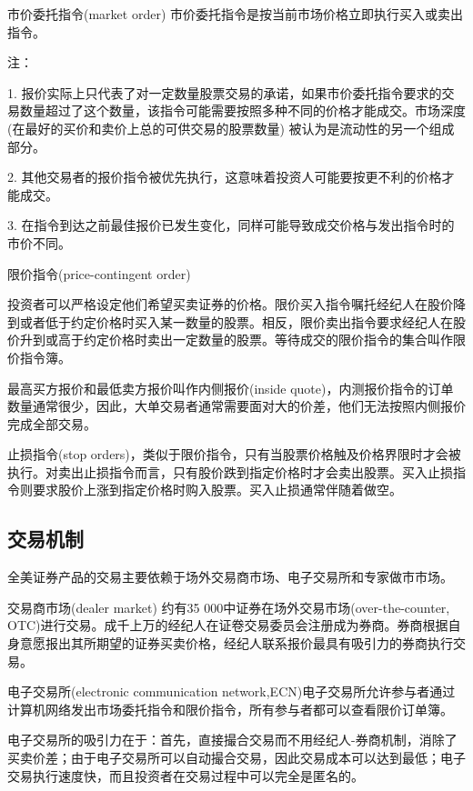\documentclass{article}
\begin{document}
市价委托指令(market order) 市价委托指令是按当前市场价格立即执行买入或卖出指令。

注：

1. 报价实际上只代表了对一定数量股票交易的承诺，如果市价委托指令要求的交易数量超过了这个数量，该指令可能需要按照多种不同的价格才能成交。市场深度(在最好的买价和卖价上总的可供交易的股票数量) 被认为是流动性的另一个组成部分。

2. 其他交易者的报价指令被优先执行，这意味着投资人可能要按更不利的价格才能成交。

3. 在指令到达之前最佳报价已发生变化，同样可能导致成交价格与发出指令时的市价不同。

\hspace*{\fill}

限价指令(price-contingent order)

投资者可以严格设定他们希望买卖证券的价格。限价买入指令嘱托经纪人在股价降到或者低于约定价格时买入某一数量的股票。相反，限价卖出指令要求经纪人在股价升到或高于约定价格时卖出一定数量的股票。等待成交的限价指令的集合叫作限价指令簿。

最高买方报价和最低卖方报价叫作内侧报价(inside quote)，内测报价指令的订单数量通常很少，因此，大单交易者通常需要面对大的价差，他们无法按照内侧报价完成全部交易。

止损指令(stop orders)，类似于限价指令，只有当股票价格触及价格界限时才会被执行。对卖出止损指令而言，只有股价跌到指定价格时才会卖出股票。买入止损指令则要求股价上涨到指定价格时购入股票。买入止损通常伴随着做空。

\subsection{交易机制}
全美证券产品的交易主要依赖于场外交易商市场、电子交易所和专家做市市场。

交易商市场(dealer market) 约有35 000中证券在场外交易市场(over-the-counter, OTC)进行交易。成千上万的经纪人在证卷交易委员会注册成为券商。券商根据自身意愿报出其所期望的证券买卖价格，经纪人联系报价最具有吸引力的券商执行交易。

\hspace*{\fill}

电子交易所(electronic communication network,ECN)电子交易所允许参与者通过计算机网络发出市场委托指令和限价指令，所有参与者都可以查看限价订单簿。

电子交易所的吸引力在于：首先，直接撮合交易而不用经纪人-券商机制，消除了买卖价差；由于电子交易所可以自动撮合交易，因此交易成本可以达到最低；电子交易执行速度快，而且投资者在交易过程中可以完全是匿名的。
\end{document}
